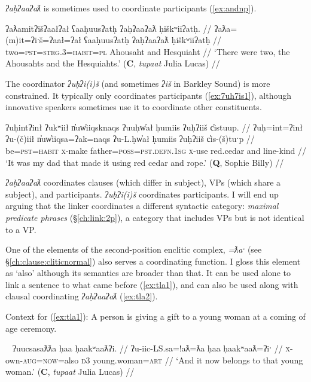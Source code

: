 \textit{ʔaḥʔaaʔaƛ} is sometimes used to coordinate participants (\ref{ex:andnp}).

\ex \label{ex:andnp}
\begingl
\glpreamble ʔaƛamitʔišʔaałʔał ʕaaḥuusʔatḥ ʔaḥʔaaʔaƛ ḥiškʷiiʔatḥ. //
\gla ʔaƛa=(m)it=ʔiˑš=ʔaał=ʔał ʕaaḥuusʔatḥ ʔaḥʔaaʔaƛ ḥiškʷiiʔatḥ //
\glb two=\textsc{pst}=\textsc{strg.3}=\textsc{habit}=\textsc{pl} Ahousaht and Hesquiaht //
\glft `There were two, the Ahousahts and the Hesquiahts.' (\textbf{C}, \textit{tupaat} Julia Lucas) //
\endgl
\xe

The coordinator \textit{ʔuḥʔi(i)š} (and sometimes \textit{ʔiš} in Barkley Sound) is more constrained. It typically only coordinates participants (\ref{ex:7uh7is1}), although innovative speakers sometimes use it to coordinate other constituents.

\ex \label{ex:7uh7is1}
\begingl
\glpreamble ʔuḥintʔinł ʔukʷiił n̓uw̓iiqsknaqs ʔuuḥw̓ał ḥumiis ʔuḥʔiiš c̓istuup. //
\gla ʔuḥ=int=ʔinł ʔu-(č)iił n̓uw̓iiqsa=ʔak=naqs ʔu-L.ḥw̓ał ḥumiis ʔuḥʔiiš c̓is-(š)tuˑp //
\glb be=\textsc{pst}=\textsc{habit} \textsc{x}-make father=\textsc{poss}=\textsc{pst.defn.1sg} \textsc{x}-use red.cedar and line-kind //
\glft `It was my dad that made it using red cedar and rope.' (\textbf{Q}, Sophie Billy) //
\endgl
\xe

\textit{ʔaḥʔaaʔaƛ} coordinates clauses (which differ in subject), VPs (which share a subject), and participants. \textit{ʔuḥʔi(i)š} coordinates participants. I will end up arguing that the linker coordinates a different syntactic category: \textit{maximal predicate phrases} (\S\ref{ch:link:2p}), a category that includes VPs but is not identical to a VP.

One of the elements of the second-position enclitic complex, \textit{=ƛaˑ} (see \S\ref{ch:clause:cliticnormal}) also serves a coordinating function. I gloss this element as `also' although its semantics are broader than that. It can be used alone to link a sentence to what came before (\ref{ex:tla1}), and can also be used along with clausal coordinating \textit{ʔaḥʔaaʔaƛ} (\ref{ex:tla2}).

\noindent Context for (\ref{ex:tla1}): A person is giving a gift to a young woman at a coming of age ceremony.

\ex~ \label{ex:tla1}
\begingl
\glpreamble ʔuucsasaƛƛa ḥaa ḥaakʷaaƛʔi. //
\gla ʔu-iic-LS.sa=!aƛ=ƛa ḥaa ḥaakʷaaƛ=ʔiˑ //
\glb \textsc{x}-own-\textsc{aug}=\textsc{now}=also \textsc{d3} young.woman=\textsc{art} //
\glft `And it now belongs to that young woman.' (\textbf{C}, \textit{tupaat} Julia Lucas) //
\endgl
\xe


